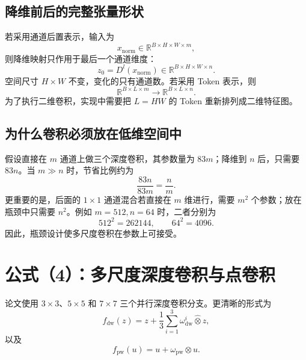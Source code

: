\documentclass[UTF8,12pt,a4paper,fontset=none]{ctexart}
\newcommand{\R}{\mathbb{R}}
\begin{document}
\subsection{降维前后的完整张量形状}

若采用通道后置表示，输入为
\begin{equation}
 x_{\mathrm{norm}}\in\R^{B\times H\times W\times m},
\end{equation}
则降维映射只作用于最后一个通道维度：
\begin{equation}
 z_0=D^l(x_{\mathrm{norm}})\in\R^{B\times H\times W\times n}.
\end{equation}
空间尺寸 $H\times W$ 不变，变化的只有通道数。若采用 Token 表示，则
\begin{equation}
 \R^{B\times L\times m}\longrightarrow\R^{B\times L\times n}.
\end{equation}
为了执行二维卷积，实现中需要把 $L=HW$ 的 Token 重新排列成二维特征图。

\subsection{为什么卷积必须放在低维空间中}

假设直接在 $m$ 通道上做三个深度卷积，其参数量为 $83m$；降维到 $n$ 后，只需要 $83n$。当 $m\gg n$ 时，节省比例约为
\begin{equation}
 \frac{83n}{83m}=\frac{n}{m}.
\end{equation}
更重要的是，后面的 $1\times1$ 通道混合若直接在 $m$ 维进行，需要 $m^2$ 个参数；放在瓶颈中只需要 $n^2$。例如 $m=512,n=64$ 时，二者分别为
\begin{equation}
 512^2=262144,
 \qquad
 64^2=4096.
\end{equation}
因此，瓶颈设计使多尺度卷积在参数上可接受。

\section{公式（4）：多尺度深度卷积与点卷积}

论文使用 $3\times3$、$5\times5$ 和 $7\times7$ 三个并行深度卷积分支。更清晰的形式为
\begin{equation}
 f_{\mathrm{dw}}(z)
 =z+\frac{1}{3}\sum_{i=1}^{3}
 \omega_{\mathrm{dw}}^i\widehat{\otimes}z,
 \tag{4a}
\end{equation}
以及
\begin{equation}
 f_{\mathrm{pw}}(u)
 =u+\omega_{\mathrm{pw}}\otimes u.
 \tag{4b}
\end{equation}
\end{document}
